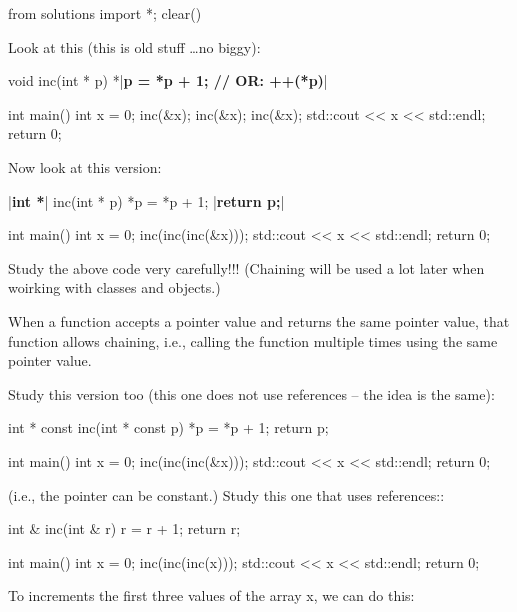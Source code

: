 \begin{python0}
from solutions import *; clear()
\end{python0}

Look at this (this is old stuff \ldots no biggy):

\begin{consolethree}[escapeinside=||]
void inc(int * p)
{
    *|\textbf{p = *p + 1; // OR: ++(*p)}|
}

int main()
{
    int x = 0;
    inc(&x); inc(&x); inc(&x);
    std::cout << x << std::endl;
    return 0;
}
\end{consolethree}
Now look at this version:

\begin{consolethree}[escapeinside=||]

|\textbf{int *}| inc(int * p)
{
    *p = *p + 1;
    |\textbf{return p;}|
}

int main()
{
    int x = 0;
    inc(inc(inc(&x)));
    std::cout << x << std::endl;
    return 0;
}
\end{consolethree}
Study the above code very carefully!!! (Chaining will be used a lot later when woirking with classes and objects.)

When a function accepts a pointer value and returns the same pointer value, that function allows chaining, i.e., calling the function multiple times using the same pointer value.

Study this version too (this one does not use references -- the idea is the same):

\begin{consolethree}[escapeinside=||]

int * const inc(int * const p)
{
    *p = *p + 1;
    return p;
}

int main()
{
    int x = 0;
    inc(inc(inc(&x)));
    std::cout << x << std::endl;
    return 0;
}
\end{consolethree}
(i.e., the pointer can be constant.) Study this one that uses references::

\begin{consolethree}[escapeinside=||]
int & inc(int & r)
{
    r = r + 1;
    return r;
}

int main()
{
    int x = 0;
    inc(inc(inc(x)));
    std::cout << x << std::endl;
    return 0;
}
\end{consolethree}



To increments the first three values of the array x, we can do this:

\begin{consolethree}[escapeinside=||]
int index = 0;

int x[] = {3, 5, 7, 9, 2);

inc(inc(inc(&index, x), x), x); 
\end{consolethree}
